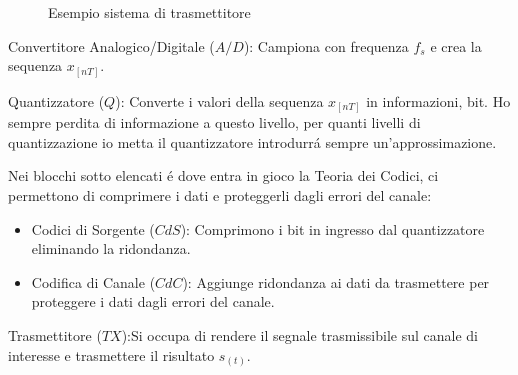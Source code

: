         \begin{figure}[H]
            \centering
            \label{fig:Sistema di comunicazione trasmettitore}
            \caption{Esempio sistema di trasmettitore}
        \end{figure}
        \begin{itemize}
            \item {Convertitore Analogico/Digitale ($A/D$): Campiona con frequenza $f_s$ e crea la sequenza $x_{[nT]}$.}
            \item {Quantizzatore ($Q$): Converte i valori della sequenza $x_{[nT]}$ in informazioni, bit. Ho sempre perdita di informazione a 
                questo livello, per quanti livelli di quantizzazione io metta il quantizzatore introdurrá sempre un'approssimazione. 
            }
            \item{Nei blocchi sotto elencati é dove entra in gioco la Teoria dei Codici, ci permettono di comprimere i dati e proteggerli dagli errori del canale:
                \begin{itemize}
                    \item {Codici di Sorgente ($CdS$): Comprimono i bit in ingresso dal quantizzatore eliminando la ridondanza.}
                    \item {Codifica di Canale ($CdC$): Aggiunge ridondanza ai dati da trasmettere per proteggere i dati dagli errori del canale.}
                \end{itemize}
            \item {Trasmettitore ($TX$):Si occupa di rendere il segnale trasmissibile sul canale di interesse e trasmettere il risultato $s_{(t)}$.}
            }
        \end{itemize}

